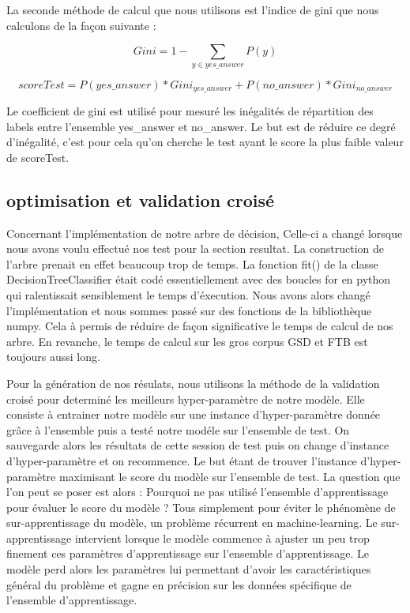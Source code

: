 \documentclass[french, 14pt]{memoir}
\begin{document}
La seconde méthode de calcul que nous utilisons est l'indice de gini que nous calculons de la façon suivante :

\begin{equation}
Gini = 1 - \sum_{y \in yes\_answer}P(y)
\end{equation}

\begin{equation}
scoreTest = P(yes\_answer) * Gini_{yes\_answer} + P(no\_answer) * Gini_{no\_answer}
\end{equation}

Le coefficient de gini est utilisé pour mesuré les inégalités de répartition des labels entre l'ensemble yes\_answer et no\_answer. Le but est de réduire ce degré d'inégalité, c'est pour cela qu'on cherche le test ayant le score la plus faible valeur de scoreTest.

\subsection{optimisation et validation croisé}

Concernant l'implémentation de notre arbre de décision, Celle-ci a changé lorsque nous avons voulu effectué nos test pour la section resultat. La construction de l'arbre prenait en effet beaucoup trop de temps. La fonction fit() de la classe DecisionTreeClassifier était codé essentiellement avec des boucles for en python qui ralentissait sensiblement le temps d'éxecution. Nous avons alors changé l'implémentation et nous sommes passé sur des fonctions de la bibliothèque numpy. Cela à permis de réduire de façon significative le temps de calcul de nos arbre. En revanche, le temps de calcul sur les gros corpus GSD et FTB est toujours aussi long. 

Pour la génération de nos résulats, nous utilisons la méthode de la validation croisé pour determiné les meilleurs hyper-paramètre de notre modèle. Elle consiste à entrainer notre modèle sur une instance d'hyper-paramètre donnée grâce à l'ensemble puis a testé notre modéle sur l'ensemble de test. On sauvegarde alors les résultats de cette session de test puis on change d'instance d'hyper-paramètre et on recommence. Le but étant de trouver l'instance d'hyper-paramètre maximisant le score du modèle sur l'ensemble de test.
La question que l'on peut se poser est alors : Pourquoi ne pas utilisé l'ensemble d'apprentissage pour évaluer le score du modèle ? 
Tous simplement pour éviter le phénomène de sur-apprentissage du modèle, un problème récurrent en machine-learning. Le sur-apprentissage intervient lorsque le modèle commence à ajuster un peu trop finement ces paramètres d'apprentissage sur l'ensemble d'apprentissage. Le modèle perd alors les paramètres lui permettant d'avoir les caractéristiques général du problème et gagne en précision sur les données spécifique de l'ensemble d'apprentissage.
\end{document}
